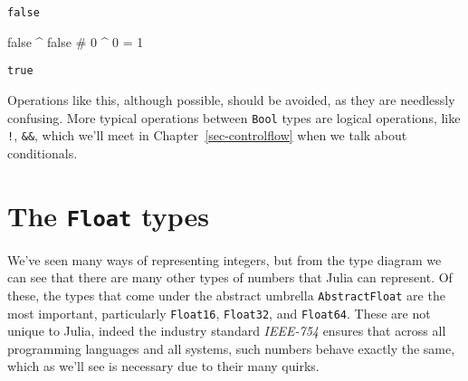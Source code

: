 \documentclass[
  letterpaper,
  DIV=11,
  numbers=noendperiod]{scrreprt}
\newenvironment{Shaded}{\begin{snugshade}}{\end{snugshade}}
\newcommand{\CommentTok}[1]{\textcolor[rgb]{0.37,0.37,0.37}{#1}}
\newcommand{\ConstantTok}[1]{\textcolor[rgb]{0.56,0.35,0.01}{#1}}
\newcommand{\OperatorTok}[1]{\textcolor[rgb]{0.37,0.37,0.37}{#1}}
\begin{document}
\begin{verbatim}
false
\end{verbatim}

\begin{Shaded}
\begin{Highlighting}[]
\ConstantTok{false} \OperatorTok{\^{}} \ConstantTok{false} \CommentTok{\# 0 \^{} 0 = 1}
\end{Highlighting}
\end{Shaded}

\begin{verbatim}
true
\end{verbatim}

\begin{tcolorbox}[enhanced jigsaw, toprule=.15mm, opacitybacktitle=0.6, leftrule=.75mm, breakable, coltitle=black, bottomrule=.15mm, colbacktitle=quarto-callout-tip-color!10!white, bottomtitle=1mm, rightrule=.15mm, title=\textcolor{quarto-callout-tip-color}{\faLightbulb}\hspace{0.5em}{Convention}, colframe=quarto-callout-tip-color-frame, left=2mm, colback=white, opacityback=0, arc=.35mm, toptitle=1mm, titlerule=0mm]

Operations like this, although possible, should be avoided, as they are
needlessly confusing. More typical operations between \texttt{Bool}
types are logical operations, like \texttt{!}, \texttt{\&\&},
\texttt{\textbar{}\textbar{}} which we'll meet in
Chapter~\ref{sec-controlflow} when we talk about conditionals.

\end{tcolorbox}

\hypertarget{the-float-types}{%
\section{\texorpdfstring{The \texttt{Float}
types}{The Float types}}\label{the-float-types}}

We've seen many ways of representing integers, but from the type diagram
we can see that there are many other types of numbers that Julia can
represent. Of these, the types that come under the abstract umbrella
\texttt{AbstractFloat} are the most important, particularly
\texttt{Float16}, \texttt{Float32}, and \texttt{Float64}. These are not
unique to Julia, indeed the industry standard \emph{IEEE-754} ensures
that across all programming languages and all systems, such numbers
behave exactly the same, which as we'll see is necessary due to their
many quirks.
\end{document}
